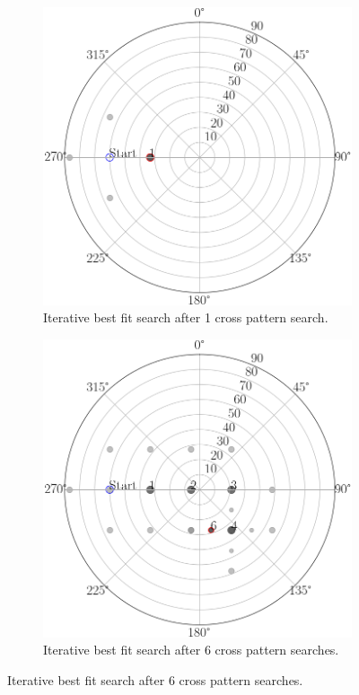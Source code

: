 \begin{figure}[H]
     \centering
     \begin{subfigure}[b]{0.45\textwidth}
         \centering
         \includegraphics[width=\textwidth]{pics/iterative_1_step}
         \caption{Iterative best fit search after 1 cross pattern search.}
         \label{fig_iterative_1_step}
     \end{subfigure}
     \hfill
     \begin{subfigure}[b]{0.45\textwidth}
         \centering
         \includegraphics[width=\textwidth]{pics/iterative_6_step}
         \caption{Iterative best fit search after 6 cross pattern searches.}
         \label{fig_iterative_6_step}
     \end{subfigure}
     \hfill
     

\end{figure}
